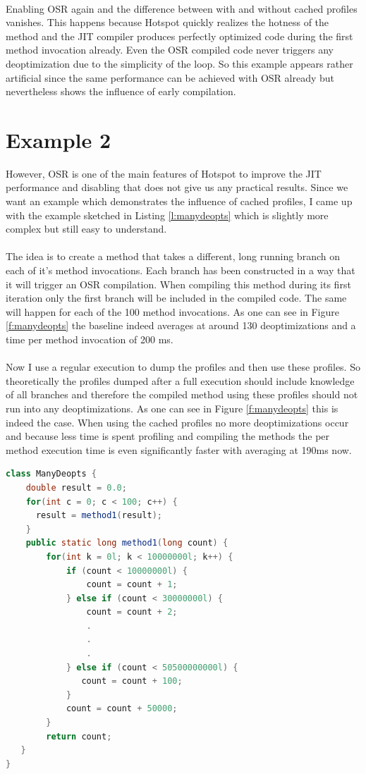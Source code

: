 \\
Enabling OSR again and the difference between with and without cached profiles vanishes.
This happens because Hotspot quickly realizes the hotness of the method and the JIT compiler produces perfectly optimized code during the first method invocation already. 
Even the OSR compiled code never triggers any deoptimization due to the simplicity of the loop.
So this example appears rather artificial since the same performance can be achieved with OSR already but nevertheless shows the influence of early compilation.
\section{Example 2}
\label{s:ex2}
However, OSR is one of the main features of Hotspot to improve the JIT performance and disabling that does not give us any practical results. Since we want an example which demonstrates the influence of cached profiles, I came up with the example sketched in Listing \ref{l:manydeopts} which is slightly more complex but still easy to understand.
\\\\
The idea is to create a method that takes a different, long running branch on each of it's method invocations. Each branch has been constructed in a way that it will trigger an OSR compilation. When compiling this method during its first iteration only the first branch will be included in the compiled code. The same will happen for each of the 100 method invocations. As one can see in Figure \ref{f:manydeopts} the baseline indeed averages at around 130 deoptimizations and a time per method invocation of 200 ms.
\\\\
Now I use a regular execution to dump the profiles and then use these profiles. So theoretically the profiles dumped after a full execution should include knowledge of all branches and therefore the compiled method using these profiles should not run into any deoptimizations. As one can see in Figure \ref{f:manydeopts} this is indeed the case. When using the cached profiles no more deoptimizations occur and because less time is spent profiling and compiling the methods the per method execution time is even significantly faster with averaging at 190ms now.
\begin{lstlisting}[float,caption=Simple method that causes many deoptimizations,label=l:manydeopts,language=Java]
class ManyDeopts {
    double result = 0.0;
    for(int c = 0; c < 100; c++) {
      result = method1(result);
    }
    public static long method1(long count) {
        for(int k = 0l; k < 10000000l; k++) {
            if (count < 10000000l) {
                count = count + 1;
            } else if (count < 30000000l) {
                count = count + 2;
                .
                .
                .
            } else if (count < 50500000000l) {
               count = count + 100;
            }
            count = count + 50000;
        }
        return count;
   }
}
\end{lstlisting}
